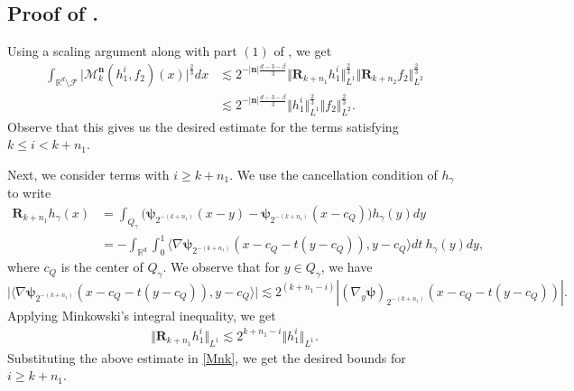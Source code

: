 \documentclass[a4paper,reqno]{amsart}
\newcounter{old}
\numberwithin{equation}{section}
\begin{document}
	\subsection*{Proof of .}
	Using a scaling argument along with part $(1)$ of , we get
	\begin{align}\label{Mnk}
		\int_{\mathbb{R}^{d}\setminus \mathcal{F}}\Big|\mathcal{M}^{\mathbf{n}}_k(h^{i}_1,f_2)(x)\Big|^{\frac{2}{3}}dx&\lesssim2^{-|\mathbf{n}|\frac{d-3-\beta}{3}}\Vert \mathbf{R}_{k+n_1}h^{i}_{1}\Vert^{\frac{2}{3}}_{L^{1}}\Vert \mathbf{R}_{k+n_2}f_{2}\Vert^{\frac{2}{3}}_{L^{2}}\\
		&\nonumber\lesssim 2^{-|\mathbf{n}|\frac{d-3-\beta}{3}}\Vert h^{i}_{1}\Vert^{\frac{2}{3}}_{L^{1}}\Vert f_{2}\Vert^{\frac{2}{3}}_{L^{2}}.
	\end{align}
	Observe that this gives us the desired estimate for the terms satisfying $k\leq i<k+n_1$. 
	
	Next, we consider terms with $i\geq k+n_1$. We use the cancellation condition of  $h_\gamma$ to write
	\begin{align*}
		\mathbf{R}_{k+n_1}h_{\gamma}(x)&=\int_{Q_{\gamma}} \Big(\boldsymbol{\psi}_{2^{-(k+n_1)}}(x-y)-\boldsymbol{\psi}_{2^{-(k+n_1)}}(x-c_{Q})\Big)h_{\gamma}(y)dy\\
		&=-\int_{\mathbb{R}^{d}}\int^{1}_{0}\langle \nabla\boldsymbol{\psi}_{2^{-(k+n_1)}}(x-c_{Q}-t(y-c_{Q})),y-c_{Q}\rangle dt~h_{\gamma}(y) dy, 
	\end{align*}
	where $c_Q$ is the center of $Q_{\gamma}$. We observe that for $y\in Q_{\gamma}$, we have 
	\[\Big|\langle \nabla\boldsymbol{\psi}_{2^{-(k+n_1)}}(x-c_{Q}-t(y-c_{Q})),y-c_{Q}\rangle\Big|\lesssim {2^{(k+n_1-i)}}|(\nabla_{y}\boldsymbol{\psi})_{2^{-(k+n_1)}}(x-c_{Q}-t(y-c_{Q}))|.\]
	Applying Minkowski's integral inequality, we get 
	\begin{align*}
		\Vert \mathbf{R}_{k+n_1}h^{i}_{1}\Vert_{L^{1}}\lesssim 2^{k+n_1-i}\Vert h^{i}_{1}\Vert_{L^{1}}.
	\end{align*}
	Substituting the above estimate in \eqref{Mnk}, we get the desired bounds for $i\geq k+n_1$.
	
\end{document}
